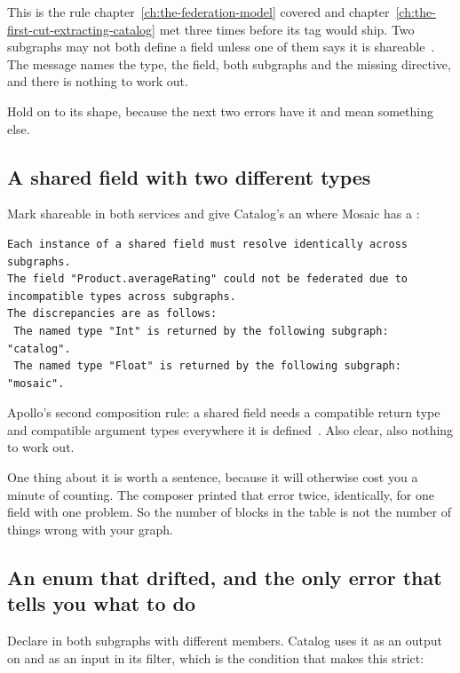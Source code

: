 This is the rule
chapter~\ref{ch:the-federation-model} covered and
chapter~\ref{ch:the-first-cut-extracting-catalog} met three times before its tag
would ship. Two subgraphs may not both define a field unless one of them says it
is shareable~\autocite{apollo2026compositionrules}. The message names the type,
the field, both subgraphs and the missing directive, and there is nothing to
work out.

Hold on to its shape, because the next two errors have it and mean something
else.

\subsection*{A shared field with two different types}

Mark  shareable in both services and give Catalog's an
 where Mosaic has a :

\begin{verbatim}
Each instance of a shared field must resolve identically across subgraphs.
The field "Product.averageRating" could not be federated due to incompatible types across subgraphs.
The discrepancies are as follows:
 The named type "Int" is returned by the following subgraph: "catalog".
 The named type "Float" is returned by the following subgraph: "mosaic".
\end{verbatim}

Apollo's second composition rule: a shared field needs a compatible return type
and compatible argument types everywhere it is
defined~\autocite{apollo2026compositionrules}. Also clear, also nothing to work
out.

%
One thing about it is worth a sentence, because it will otherwise cost you a
minute of counting. The composer printed that error twice, identically, for one
field with one problem. So the number of blocks in the table is not the number
of things wrong with your graph.

\subsection*{An enum that drifted, and the only error that tells you what to do}

%
Declare  in both subgraphs with different members. Catalog
uses it as an output on  and as an input in its filter,
which is the condition that makes this strict:

